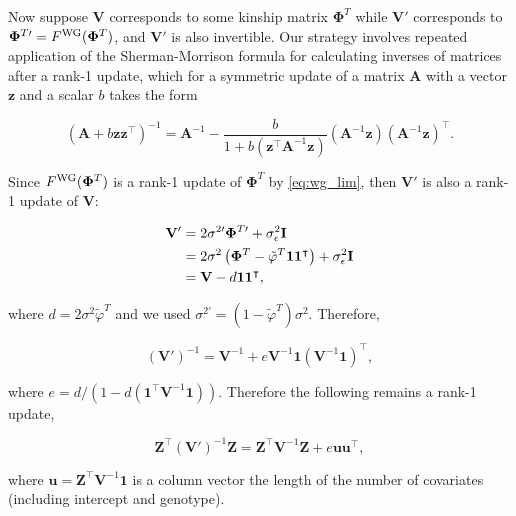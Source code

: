 \documentclass[11pt]{article}
\newcommand{\kinMat}[1][T]{%
  \ensuremath{%
    \mathbf{\Phi}^{#1}
  }%
  \xspace%
}%
\newcommand{\kinMatPrime}{%
  \ensuremath{%
    \mathbf{\Phi}^{T\prime}
  }%
  \xspace%
}%
\begin{document}
\begin{linenumbers}
\begin{appendices}
  Now suppose $\mathbf{V}$ corresponds to some kinship matrix \kinMat while $\mathbf{V}'$ corresponds to $\kinMatPrime = F^\text{WG}(\kinMat)$, and $\mathbf{V}'$ is also invertible.
  Our strategy involves repeated application of the Sherman-Morrison formula for calculating inverses of matrices after a rank-1 update, which for a symmetric update of a matrix $\mathbf{A}$ with a vector $\mathbf{z}$ and a scalar $b$ takes the form \citep{sherman_adjustment_1950}
  \begin{linenomath*}
  $$
  \left( \mathbf{A} + b \mathbf{z}\mathbf{z}^\intercal \right)^{-1}
  =
  \mathbf{A}^{-1} - \frac{
    b
  }{
    1 + b \left( \mathbf{z}^\intercal \mathbf{A}^{-1} \mathbf{z} \right)
  }
  \left( \mathbf{A}^{-1} \mathbf{z} \right) \left( \mathbf{A}^{-1} \mathbf{z} \right)^\intercal
  .
  $$
  \end{linenomath*}
  Since $F^\text{WG}(\kinMat)$ is a rank-1 update of \kinMat by \cref{eq:wg_lim}, then $\mathbf{V}'$ is also a rank-1 update of $\mathbf{V}$:
  \begin{linenomath*}
  \begin{align*}
    \mathbf{V}'
    &=
      2 \sigma^{2\prime} \kinMatPrime + \sigma^2_\epsilon \mathbf{I}
      \\
    &=
      2 \sigma^2 \left( \kinMat - \tilde{\varphi}^T \mathbf{1}\mathbf{1}^\intercal \right)
      + \sigma^2_\epsilon \mathbf{I}
      \\
    &=
    \mathbf{V} - d \mathbf{1}\mathbf{1}^\intercal
    ,
  \end{align*}
  \end{linenomath*}
  where $d = 2 \sigma^2 \tilde{\varphi}^T$ and we used $\sigma^{2\prime} = \left( 1 - \tilde{\varphi}^T \right) \sigma^2$.
  Therefore,
  \begin{linenomath*}
  $$
  \left( \mathbf{V}' \right)^{-1}
  =
  \mathbf{V}^{-1} + e \mathbf{V}^{-1} \mathbf{1} \left( \mathbf{V}^{-1} \mathbf{1} \right)^\intercal
  ,
  $$
  \end{linenomath*}
  where $e = d / \left( 1 - d \left( \mathbf{1}^\intercal \mathbf{V}^{-1} \mathbf{1} \right) \right)$.
  Therefore the following remains a rank-1 update,
  \begin{linenomath*}
  $$
  \mathbf{Z}^\intercal \left( \mathbf{V}' \right)^{-1} \mathbf{Z}
  =
  \mathbf{Z}^\intercal \mathbf{V}^{-1} \mathbf{Z} + e \mathbf{u} \mathbf{u}^\intercal
  ,
  $$
  \end{linenomath*}
  where $\mathbf{u} = \mathbf{Z}^\intercal \mathbf{V}^{-1} \mathbf{1}$ is a column vector the length of the number of covariates (including intercept and genotype).

\end{appendices}
\end{linenumbers}
\end{document}
